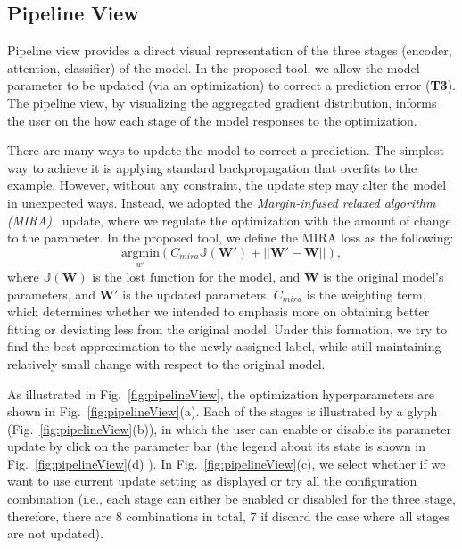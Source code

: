 \subsection{Pipeline View}
\label{sec:pipeline}
Pipeline view provides a direct visual representation of the three stages (encoder, attention, classifier) of the model. In the proposed tool, we allow the model parameter to be updated (via an optimization) to correct a prediction error (\textbf{T3}). The pipeline view, by visualizing the aggregated gradient distribution, informs the user on the how each stage of the model responses to the optimization.

There are many ways to update the model to correct a prediction. The simplest way to achieve it is applying standard backpropagation that overfits to the example. However, without any constraint, the update step may alter the model in unexpected ways.
Instead, we adopted the \emph{Margin-infused relaxed algorithm (MIRA)}~\cite{CrammerSinger2003} update, where we regulate the optimization with the amount of change to the parameter. In the proposed tool, we define the MIRA loss as the following:
\begin{equation}
\underset{w'}{\mathrm{argmin}}( C_{mira} \mathbb{J}(\mathbf{W}') + ||\mathbf{W}' - \mathbf{W}||),
\end{equation}
where $\mathbb{J}(\mathbf{W})$ is the lost function for the model, and $\mathbf{W}$ is the original model's parameters, and $\mathbf{W}'$ is the updated parameters. $C_{mira}$ is the weighting term, which determines whether we intended to emphasis more on obtaining better fitting or deviating less from the original model.
%
Under this formation, we try to find the best approximation to the newly assigned label, while still maintaining relatively small change with respect to the original model.

As illustrated in Fig.~\ref{fig:pipelineView},
the optimization hyperparameters are shown in Fig.~\ref{fig:pipelineView}(a). Each of the stages is illustrated by a glyph (Fig.~\ref{fig:pipelineView}(b)), in which the user can enable or disable its parameter update by click on the parameter bar (the legend about its state is shown in Fig.~\ref{fig:pipelineView}(d) ). In Fig.~\ref{fig:pipelineView}(c), we select whether if we want to use current update setting as displayed or try all the configuration combination (i.e., each stage can either be enabled or disabled for the three stage, therefore, there are $8$ combinations in total, $7$ if discard the case where all stages are not updated).

